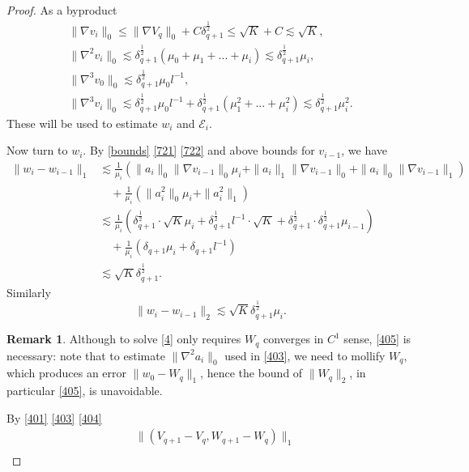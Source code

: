 \documentclass[reqno,12pt]{amsart}
\numberwithin{equation}{section}
\theoremstyle{plain}
\theoremstyle{definition}
\newtheorem{rem}[thm]{Remark}
\newcommand{\E}{\mathcal{E}}
\begin{document}
\begin{proof}
As a byproduct
\begin{gather*}
    \|\nabla v_i\|_0\le \|\nabla V_q\|_0+C\delta_{q+1}^\frac{1}{2}\le \sqrt{K}+C\lesssim\sqrt{K},\\
    \|\nabla^2 v_i\|_0\lesssim \delta_{q+1}^\frac{1}{2}(\mu_0+\mu_1+...+\mu_i)\lesssim\delta_{q+1}^\frac{1}{2}\mu_i,\\
    \|\nabla^3 v_0\|_0\lesssim \delta_{q+1}^\frac{1}{2}\mu_0 l^{-1},\\
    \|\nabla^3 v_i\|_0\lesssim \delta_{q+1}^\frac{1}{2}\mu_0 l^{-1}+\delta_{q+1}^\frac{1}{2}(\mu_1^2+...+\mu_i^2)\lesssim \delta_{q+1}^\frac{1}{2}\mu_i^2.
\end{gather*}
These will be used to estimate $w_i$ and $\E_i$.

Now turn to $w_i$. By \eqref{bounds} \eqref{721} \eqref{722} and above bounds for $v_{i-1}$,  we have
\begin{equation}\label{404}
\begin{aligned}
    \|w_i-w_{i-1}\|_1
    &\lesssim \frac{1}{\mu_i}(\|a_i\|_0\|\nabla v_{i-1}\|_0\mu_i+\|a_i\|_1\|\nabla v_{i-1}\|_0+\|a_i\|_0\|\nabla v_{i-1}\|_1)\\
    &\quad +\frac{1}{\mu_i}(\|a_i^2\|_0\mu_i+\|a_i^2\|_1)\\
    &\lesssim  \frac{1}{\mu_i}(\delta_{q+1}^\frac{1}{2} \cdot\sqrt{K}\mu_i+\delta_{q+1}^\frac{1}{2}l^{-1}\cdot\sqrt{K}+\delta_{q+1}^\frac{1}{2}\cdot \delta_{q+1}^\frac{1}{2}\mu_{i-1})\\
    &\quad +\frac{1}{\mu_i}(\delta_{q+1}\mu_i+\delta_{q+1}l^{-1})\\
    &\lesssim\sqrt{K}\delta_{q+1}^\frac{1}{2}.
\end{aligned}
\end{equation}
Similarly 
\begin{equation}\label{405}
    \|w_i-w_{i-1}\|_2\lesssim \sqrt{K}\delta_{q+1}^\frac{1}{2}\mu_i.
\end{equation}
\begin{rem}\label{rem998}
Although to solve \eqref{4} only requires $W_q$ converges in $C^1$ sense, \eqref{405} is necessary: note that to estimate $\|\nabla^2 a_i\|_0$ used in \eqref{403}, we need to mollify $W_q$, which produces an error $\|w_0-W_q\|_1$, hence the bound of $\|W_q\|_2$, in particular \eqref{405}, is unavoidable. 
\end{rem}
By \eqref{401} \eqref{403} \eqref{404}
\begin{equation}\label{K6}
\begin{aligned}
    &\|(V_{q+1}-V_q, W_{q+1}-W_q)\|_1\\

\end{aligned}
\end{equation}
\end{proof}
\end{document}
